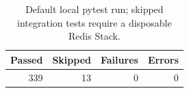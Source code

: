 \begin{table}[H]
\centering
\footnotesize
\caption{Default local pytest run; skipped integration tests require a disposable Redis Stack.}
\label{tab:checks}
\begin{tabular}{|r|r|r|r|}
\hline
Passed & Skipped & Failures & Errors \\ \hline
339 & 13 & 0 & 0 \\ \hline
\end{tabular}
\end{table}
